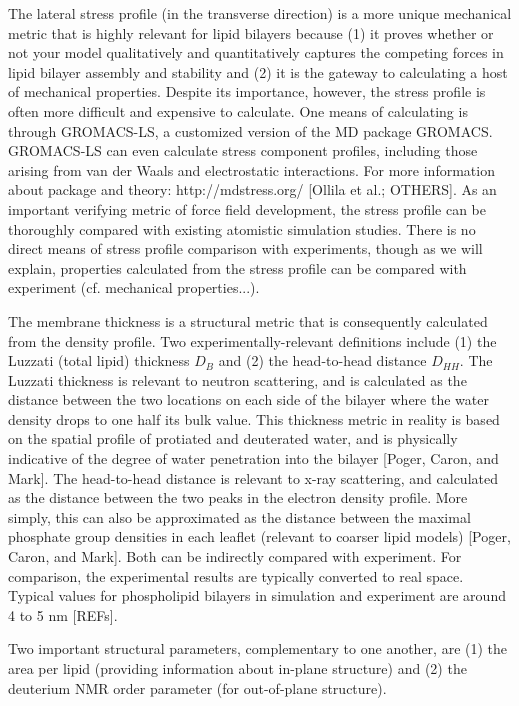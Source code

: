 \documentclass[9pt,bestpractices]{livecoms}
\begin{document}
The lateral stress profile (in the transverse direction) is a more unique mechanical metric that is highly relevant for lipid bilayers because (1) it proves whether or not your model qualitatively and quantitatively captures the competing forces in lipid bilayer assembly and stability and (2) it is the gateway to calculating a host of mechanical properties.
Despite its importance, however, the stress profile is often more difficult and expensive to calculate.
One means of calculating is through GROMACS-LS, a customized version of the MD package GROMACS.
GROMACS-LS can even calculate stress component profiles, including those arising from van der Waals and electrostatic interactions.
For more information about package and theory: http://mdstress.org/ [Ollila et al.; OTHERS].
As an important verifying metric of force field development, the stress profile can be thoroughly compared with existing atomistic simulation studies.
There is no direct means of stress profile comparison with experiments, though as we will explain, properties calculated from the stress profile can be compared with experiment (cf. mechanical properties...).

The membrane thickness is a structural metric that is consequently calculated from the density profile. Two experimentally-relevant definitions include (1) the Luzzati (total lipid) thickness $D_B$ and (2) the head-to-head distance $D_{HH}$.
The Luzzati thickness is relevant to neutron scattering, and is calculated as the distance between the two locations on each side of the bilayer where the water density drops to one half its bulk value.
This thickness metric in reality is based on the spatial profile of protiated and deuterated water, and is physically indicative of the degree of water penetration into the bilayer [Poger, Caron, and Mark].
The head-to-head distance is relevant to x-ray scattering, and calculated as the distance between the two peaks in the electron density profile.
More simply, this can also be approximated as the distance between the maximal phosphate group densities in each leaflet (relevant to coarser lipid models) [Poger, Caron, and Mark].
Both can be indirectly compared with experiment.
For comparison, the experimental results are typically converted to real space.
Typical values for phospholipid bilayers in simulation and experiment are around 4 to 5 nm [REFs].

Two important structural parameters, complementary to one another, are (1) the area per lipid (providing information about in-plane structure) and (2) the deuterium NMR order parameter (for out-of-plane structure).
\end{document}
